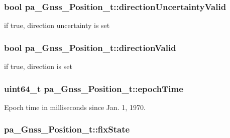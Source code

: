 \subsubsection[{\texorpdfstring{direction\+Uncertainty\+Valid}{directionUncertaintyValid}}]{\setlength{\rightskip}{0pt plus 5cm}bool pa\+\_\+\+Gnss\+\_\+\+Position\+\_\+t\+::direction\+Uncertainty\+Valid}\hypertarget{structpa___gnss___position__t_a3cf3e00ef65eee1aeb1dc8f266691259}{}\label{structpa___gnss___position__t_a3cf3e00ef65eee1aeb1dc8f266691259}


if true, direction uncertainty is set 

\subsubsection[{\texorpdfstring{direction\+Valid}{directionValid}}]{\setlength{\rightskip}{0pt plus 5cm}bool pa\+\_\+\+Gnss\+\_\+\+Position\+\_\+t\+::direction\+Valid}\hypertarget{structpa___gnss___position__t_a034396d8d956aab6c14109ff0e697d20}{}\label{structpa___gnss___position__t_a034396d8d956aab6c14109ff0e697d20}


if true, direction is set 

\subsubsection[{\texorpdfstring{epoch\+Time}{epochTime}}]{\setlength{\rightskip}{0pt plus 5cm}uint64\+\_\+t pa\+\_\+\+Gnss\+\_\+\+Position\+\_\+t\+::epoch\+Time}\hypertarget{structpa___gnss___position__t_a0c373651bd68eeabed00bbb1b6599f48}{}\label{structpa___gnss___position__t_a0c373651bd68eeabed00bbb1b6599f48}


Epoch time in milliseconds since Jan. 1, 1970. 

\subsubsection[{\texorpdfstring{fix\+State}{fixState}}]{ pa\+\_\+\+Gnss\+\_\+\+Position\+\_\+t\+::fix\+State}\hypertarget{structpa___gnss___position__t_a92873efa080300aa1c24c9bf14728e73}{}\label{structpa___gnss___position__t_a92873efa080300aa1c24c9bf14728e73}


